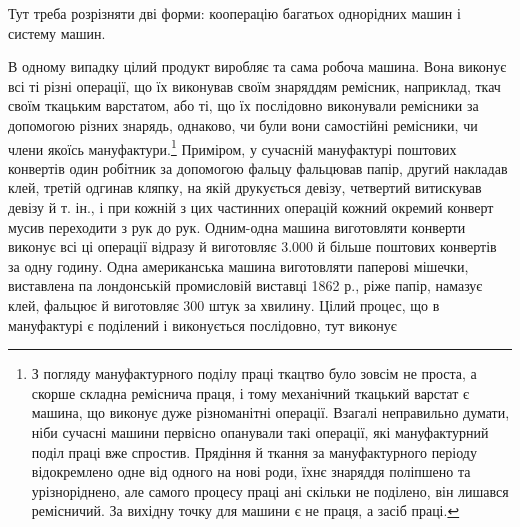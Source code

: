 Тут треба розрізняти дві форми: кооперацію багатьох однорідних
машин і систему машин.

В одному випадку цілий продукт виробляє та сама робоча
машина. Вона виконує всі ті різні операції, що їх виконував своїм
знаряддям ремісник, наприклад, ткач своїм ткацьким варстатом,
або ті, що їх послідовно виконували ремісники за допомогою
різних знарядь, однаково, чи були вони самостійні ремісники,
чи члени якоїсь мануфактури.\footnote{
З погляду мануфактурного поділу праці ткацтво було зовсім не
проста, а скорше складна реміснича праця, і тому механічний ткацький
варстат є машина, що виконує дуже різноманітні операції. Взагалі неправильно
думати, ніби сучасні машини первісно опанували такі операції,
які мануфактурний поділ праці вже спростив. Прядіння й ткання за мануфактурного
періоду відокремлено одне від одного на нові роди, їхнє знаряддя
поліпшено та урізноріднено, але самого процесу праці ані скільки
не поділено, він лишався ремісничий. За вихідну точку для машини є не
праця, а засіб праці.
} Приміром, у сучасній мануфактурі
поштових конвертів один робітник за допомогою фальцу
фальцював папір, другий накладав клей, третій одгинав кляпку,
на якій друкується девізу, четвертий витискував девізу й т. ін.,
і при кожній з цих частинних операцій кожний окремий конверт
мусив переходити з рук до рук. Одним-одна машина виготовляти
конверти виконує всі ці операції відразу й виготовляє \num{3.000} й
більше поштових конвертів за одну годину. Одна американська
машина виготовляти паперові мішечки, виставлена па лондонській
промисловій виставці 1862 р., ріже папір, намазує клей,
фальцює й виготовляє 300 штук за хвилину. Цілий процес, що в
мануфактурі є поділений і виконується послідовно, тут виконує
\parbreak{}  %
